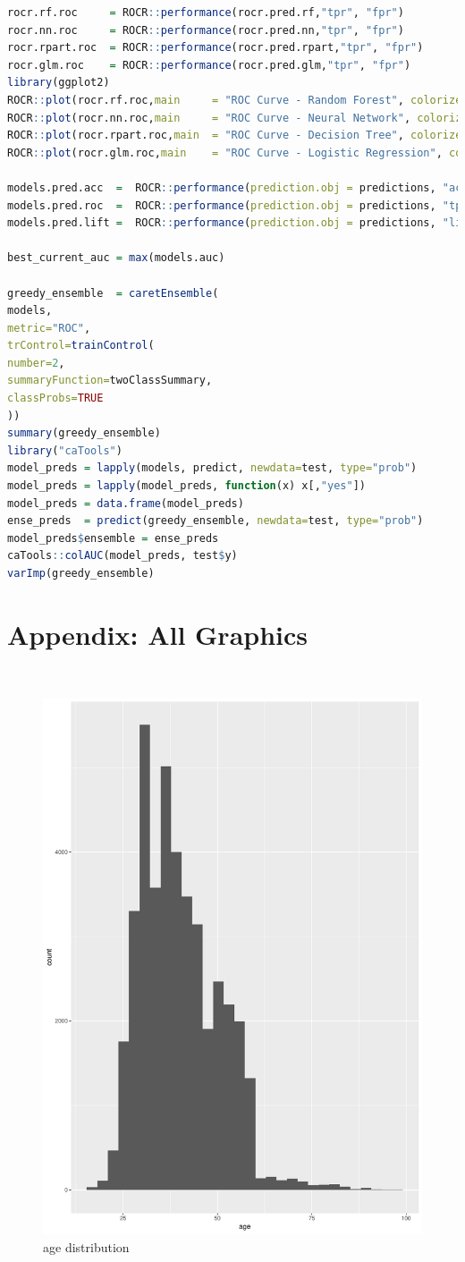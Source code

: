 \documentclass[12pt, a4paper, bibliography=totoc, english]{scrartcl}
\begin{document}
\begin{lstlisting}[language = R]
rocr.rf.roc     = ROCR::performance(rocr.pred.rf,"tpr", "fpr")
rocr.nn.roc     = ROCR::performance(rocr.pred.nn,"tpr", "fpr")
rocr.rpart.roc  = ROCR::performance(rocr.pred.rpart,"tpr", "fpr")
rocr.glm.roc    = ROCR::performance(rocr.pred.glm,"tpr", "fpr")
library(ggplot2)
ROCR::plot(rocr.rf.roc,main     = "ROC Curve - Random Forest", colorize = T,  lwd=10)
ROCR::plot(rocr.nn.roc,main     = "ROC Curve - Neural Network", colorize = T,  lwd=10)
ROCR::plot(rocr.rpart.roc,main  = "ROC Curve - Decision Tree", colorize = T,  lwd=10)
ROCR::plot(rocr.glm.roc,main    = "ROC Curve - Logistic Regression", colorize = T,  lwd=10)

models.pred.acc  =  ROCR::performance(prediction.obj = predictions, "acc")
models.pred.roc  =  ROCR::performance(prediction.obj = predictions, "tpr", "fpr")
models.pred.lift =  ROCR::performance(prediction.obj = predictions, "lift")

best_current_auc = max(models.auc)

greedy_ensemble  = caretEnsemble(
models, 
metric="ROC",
trControl=trainControl(
number=2,
summaryFunction=twoClassSummary,
classProbs=TRUE
))
summary(greedy_ensemble)
library("caTools")
model_preds = lapply(models, predict, newdata=test, type="prob")
model_preds = lapply(model_preds, function(x) x[,"yes"])
model_preds = data.frame(model_preds)
ense_preds  = predict(greedy_ensemble, newdata=test, type="prob")
model_preds$ensemble = ense_preds
caTools::colAUC(model_preds, test$y)
varImp(greedy_ensemble)
\end{lstlisting}


\section{Appendix: All Graphics}\\
\begin{figure}
	\centering
	\includegraphics[width=0.7\linewidth]{Plot1}
	\caption{age distribution}
	\label{fig:plot1}
\end{figure}
\end{document}
